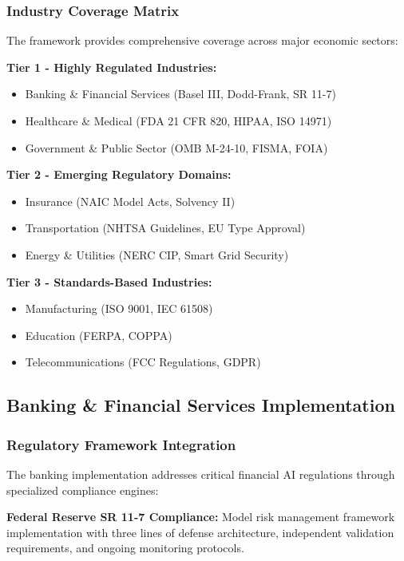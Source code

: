 \documentclass[12pt,a4paper]{article}
\begin{document}
\subsubsection{Industry Coverage Matrix}

The framework provides comprehensive coverage across major economic sectors:

\textbf{Tier 1 - Highly Regulated Industries:}
\begin{itemize}
\item Banking \& Financial Services (Basel III, Dodd-Frank, SR 11-7)
\item Healthcare \& Medical (FDA 21 CFR 820, HIPAA, ISO 14971)
\item Government \& Public Sector (OMB M-24-10, FISMA, FOIA)
\end{itemize}

\textbf{Tier 2 - Emerging Regulatory Domains:}
\begin{itemize}
\item Insurance (NAIC Model Acts, Solvency II)
\item Transportation (NHTSA Guidelines, EU Type Approval)
\item Energy \& Utilities (NERC CIP, Smart Grid Security)
\end{itemize}

\textbf{Tier 3 - Standards-Based Industries:}
\begin{itemize}
\item Manufacturing (ISO 9001, IEC 61508)
\item Education (FERPA, COPPA)
\item Telecommunications (FCC Regulations, GDPR)
\end{itemize}

\subsection{Banking \& Financial Services Implementation}

\subsubsection{Regulatory Framework Integration}

The banking implementation addresses critical financial AI regulations through specialized compliance engines:

\textbf{Federal Reserve SR 11-7 Compliance:} Model risk management framework implementation with three lines of defense architecture, independent validation requirements, and ongoing monitoring protocols.
\end{document}

